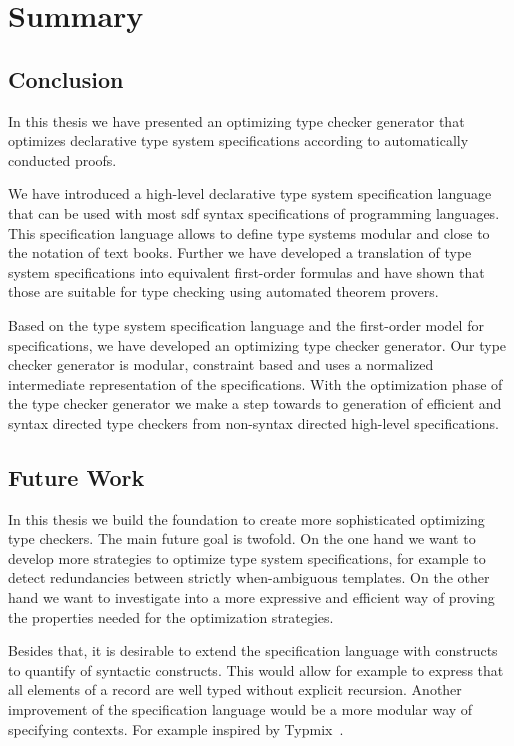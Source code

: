 \chapter{Summary}
\section{Conclusion}
In this thesis we have presented an optimizing type checker generator
that optimizes declarative type system specifications according to
automatically conducted proofs.

We have introduced a high-level declarative type system specification
language that can be used with most \gls{sdf} syntax specifications of
programming languages. This specification language allows to define
type systems modular and close to the notation of text books. Further
we have developed a translation of type system specifications into
equivalent first-order formulas and have shown that those are suitable
for type checking using automated theorem provers.

Based on the type system specification language and the first-order
model for specifications, we have developed an optimizing type checker
generator. Our type checker generator is modular, constraint based and
uses a normalized intermediate representation of the
specifications. With the optimization phase of the type checker
generator we make a step towards to generation of efficient and syntax
directed type checkers from non-syntax directed high-level
specifications.

\section{Future Work}
In this thesis we build the foundation to create more sophisticated
optimizing type checkers. The main future goal is twofold. On the one
hand we want to develop more strategies to optimize type system
specifications, for example to detect redundancies between strictly
when-ambiguous templates. On the other hand we want to investigate
into a more expressive and efficient way of proving the properties
needed for the optimization strategies.

Besides that, it is desirable to extend the specification language
with constructs to quantify of syntactic constructs. This would allow
for example to express that all elements of a record are well typed
without explicit recursion. Another improvement of the specification
language would be a more modular way of specifying contexts. For
example inspired by Typmix~\cite{bergan2007typmix}.

